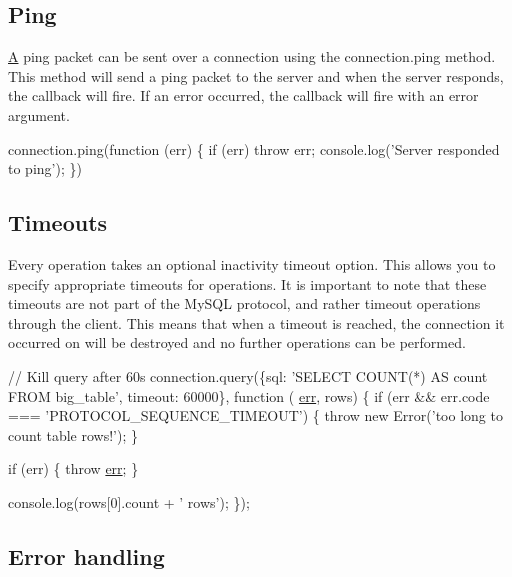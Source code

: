 \subsection*{Ping}

\hyperlink{class_a}{A} ping packet can be sent over a connection using the {\ttfamily connection.\+ping} method. This method will send a ping packet to the server and when the server responds, the callback will fire. If an error occurred, the callback will fire with an error argument.


\begin{DoxyCode}
connection.ping(\textcolor{keyword}{function} (err) \{
  \textcolor{keywordflow}{if} (err) \textcolor{keywordflow}{throw} err;
  console.log(\textcolor{stringliteral}{'Server responded to ping'});
\})
\end{DoxyCode}


\subsection*{Timeouts}

Every operation takes an optional inactivity timeout option. This allows you to specify appropriate timeouts for operations. It is important to note that these timeouts are not part of the My\+S\+Q\+L protocol, and rather timeout operations through the client. This means that when a timeout is reached, the connection it occurred on will be destroyed and no further operations can be performed.


\begin{DoxyCode}
\textcolor{comment}{// Kill query after 60s}
connection.query(\{sql: \textcolor{stringliteral}{'SELECT COUNT(*) AS count FROM big\_table'}, timeout: 60000\}, \textcolor{keyword}{function} (
      \hyperlink{message_8cpp_aede5746344fdce99647541101eaa7f06}{err}, rows) \{
  \textcolor{keywordflow}{if} (err && err.code === \textcolor{stringliteral}{'PROTOCOL\_SEQUENCE\_TIMEOUT'}) \{
    \textcolor{keywordflow}{throw} \textcolor{keyword}{new} Error(\textcolor{stringliteral}{'too long to count table rows!'});
  \}

  \textcolor{keywordflow}{if} (err) \{
    \textcolor{keywordflow}{throw} \hyperlink{message_8cpp_aede5746344fdce99647541101eaa7f06}{err};
  \}

  console.log(rows[0].count + \textcolor{stringliteral}{' rows'});
\});
\end{DoxyCode}


\subsection*{Error handling}

